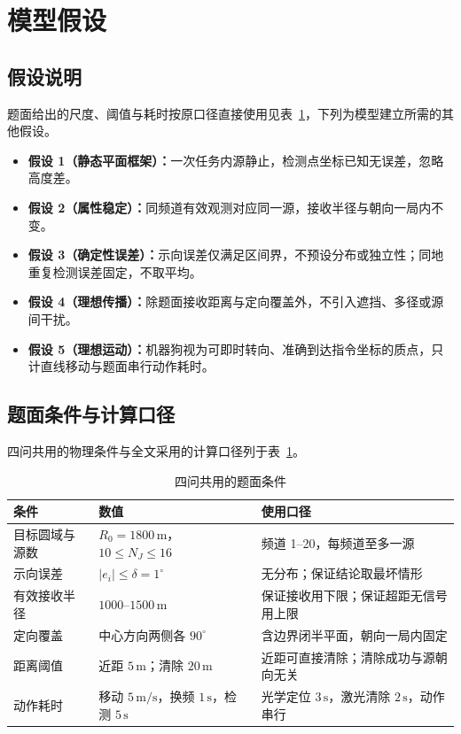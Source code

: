 \section{模型假设}

\subsection{假设说明}
题面给出的尺度、阈值与耗时按原口径直接使用见表~\ref{tab:common_conditions}，下列为模型建立所需的其他假设。
\begin{itemize}[itemindent=2em]
  \item \textbf{假设 1（静态平面框架）：}一次任务内源静止，检测点坐标已知无误差，忽略高度差。
  \item \textbf{假设 2（属性稳定）：}同频道有效观测对应同一源，接收半径与朝向一局内不变。
  \item \textbf{假设 3（确定性误差）：}示向误差仅满足区间界，不预设分布或独立性；同地重复检测误差固定，不取平均。
  \item \textbf{假设 4（理想传播）：}除题面接收距离与定向覆盖外，不引入遮挡、多径或源间干扰。
  \item \textbf{假设 5（理想运动）：}机器狗视为可即时转向、准确到达指令坐标的质点，只计直线移动与题面串行动作耗时。
\end{itemize}

\subsection{题面条件与计算口径}
四问共用的物理条件与全文采用的计算口径列于表~\ref{tab:common_conditions}。
\begin{table}[htbp]
\centering
\small
\caption{四问共用的题面条件}
\label{tab:common_conditions}
\begin{tabularx}{\textwidth}{@{}p{3cm} p{4.5cm} X@{}}
\toprule
条件 & 数值 & 使用口径 \\
\midrule
目标圆域与源数 & $R_0=1800\,\mathrm m$，$10\le N_J\le16$ & 频道 1--20，每频道至多一源 \\
示向误差 & $|e_i|\le\delta=1^\circ$ & 无分布；保证结论取最坏情形 \\
有效接收半径 & $1000$--$1500\,\mathrm m$ & 保证接收用下限；保证超距无信号用上限 \\
定向覆盖 & 中心方向两侧各 $90^\circ$ & 含边界闭半平面，朝向一局内固定 \\
距离阈值 & 近距 $5\,\mathrm m$；清除 $20\,\mathrm m$ & 近距可直接清除；清除成功与源朝向无关 \\
动作耗时 & 移动 $5\,\mathrm{m/s}$，换频 $1\,\mathrm s$，检测 $5\,\mathrm s$ & 光学定位 $3\,\mathrm s$，激光清除 $2\,\mathrm s$，动作串行 \\
\bottomrule
\end{tabularx}
\end{table}

